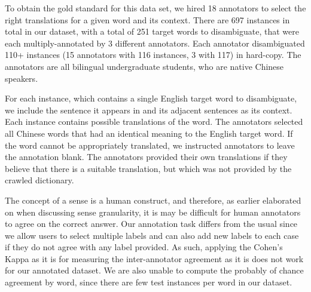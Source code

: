  


To obtain the gold standard for this data set, we hired 18 annotators to select the right translations for a given word and its context. There are 697 instances in total in our dataset, with a total of 251 target words to disambiguate, that were each multiply-annotated by 3 different annotators. Each annotator disambiguated 110+ instances (15 annotators with 116 instances, 3 with 117) in hard-copy. The annotators are all bilingual undergraduate students, who are native Chinese speakers. 

For each instance, which contains a single English target word to disambiguate, we include the sentence it appears in and its adjacent sentences as its context. Each instance contains possible translations of the word. 
The annotators selected all Chinese words that had an identical meaning to the English target word. If the word cannot be appropriately translated, we instructed annotators to leave the annotation blank. The annotators provided their own translations if they believe that there is a suitable translation, but which was not provided by the crawled dictionary. 

The concept of a sense is a human construct, and therefore, as earlier elaborated on when discussing sense granularity, it is %
may be difficult for human annotators to agree on the correct answer. 
Our annotation task differs from the usual since we allow users to select multiple labels and can also add new labels to each case if they do not agree with any label provided. As such, applying the Cohen's Kappa as it is for measuring the inter-annotator agreement as it is does not work for our annotated dataset. %
We are also unable to compute the probably of chance agreement by word, since there are few test instances per word in our dataset.

